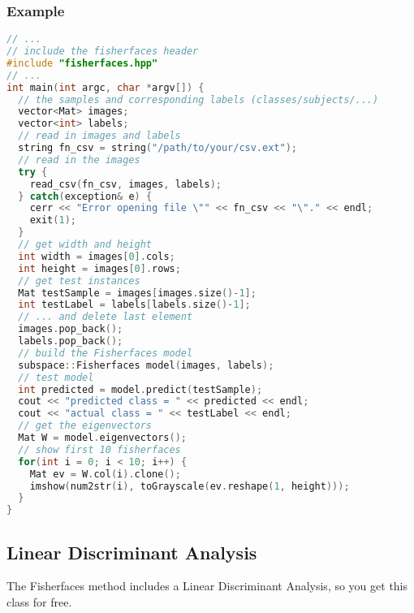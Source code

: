 \subsubsection{Example}
\begin{lstlisting}[language=c++]
// ...
// include the fisherfaces header
#include "fisherfaces.hpp"
// ...
int main(int argc, char *argv[]) {
  // the samples and corresponding labels (classes/subjects/...)
  vector<Mat> images;
  vector<int> labels;
  // read in images and labels
  string fn_csv = string("/path/to/your/csv.ext");
  // read in the images
  try {
    read_csv(fn_csv, images, labels);
  } catch(exception& e) {
    cerr << "Error opening file \"" << fn_csv << "\"." << endl;
    exit(1);
  }
  // get width and height
  int width = images[0].cols;
  int height = images[0].rows;
  // get test instances
  Mat testSample = images[images.size()-1];
  int testLabel = labels[labels.size()-1];
  // ... and delete last element
  images.pop_back();
  labels.pop_back();
  // build the Fisherfaces model
  subspace::Fisherfaces model(images, labels);
  // test model
  int predicted = model.predict(testSample);
  cout << "predicted class = " << predicted << endl;
  cout << "actual class = " << testLabel << endl;
  // get the eigenvectors
  Mat W = model.eigenvectors();
  // show first 10 fisherfaces
  for(int i = 0; i < 10; i++) {
    Mat ev = W.col(i).clone();
    imshow(num2str(i), toGrayscale(ev.reshape(1, height)));
  }
}
\end{lstlisting}

\subsection{Linear Discriminant Analysis}

The Fisherfaces method includes a Linear Discriminant Analysis, so you get this class for free.

